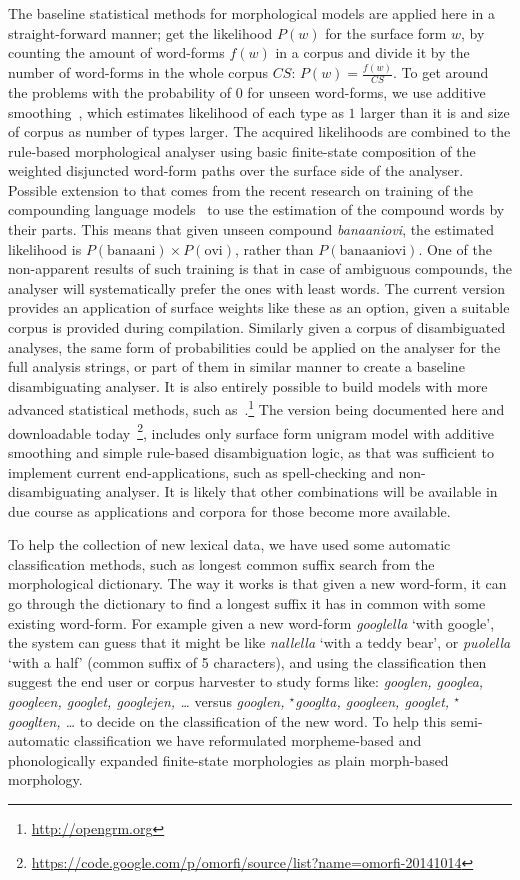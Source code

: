 \documentclass[a4paper,12pt]{article}
\begin{document}
The baseline statistical methods for morphological models are applied here in a
straight-forward manner; get the likelihood $P(w)$ for the surface form $w$, by
counting the amount of word-forms $f(w)$ in a corpus and divide it by the
number of word-forms in the whole corpus $CS$: $P(w) = \frac{f(w)}{CS}$.  To
get around the problems with the probability of $0$ for unseen word-forms, we
use additive smoothing~\citep{chen1999empirical}, which estimates likelihood of
each type as $1$ larger than it is and size of corpus as number of types
larger. The acquired likelihoods are combined to the rule-based morphological
analyser using basic finite-state composition of the weighted disjuncted
word-form paths over the surface side of the analyser. Possible extension to
that comes from the recent research on training of the compounding language
models~\citep{pirinen2009weighting} to use the estimation of the compound words
by their parts. This means that given unseen compound \emph{banaaniovi}, the
estimated likelihood is $P(\mathrm{banaani}) \times P(\mathrm{ovi})$, rather
than $P(\mathrm{banaaniovi})$. One of the non-apparent results of such training
is that in case of ambiguous compounds, the analyser will systematically prefer
the ones with least words. The current version provides an application of
surface weights like these as an option, given a suitable corpus is provided
during compilation. Similarly given a corpus of disambiguated analyses, the
same form of probabilities could be applied on the analyser for the full
analysis strings, or part of them in similar manner to create a baseline
disambiguating analyser. It is also entirely possible to build models with more
advanced statistical methods, such
as~\citet{opengrm}.\footnote{\url{http://opengrm.org}} The version being
documented here and downloadable
today~\footnote{\url{https://code.google.com/p/omorfi/source/list?name=omorfi-20141014}},
includes only surface form unigram model with additive smoothing and simple
rule-based disambiguation logic, as that was sufficient to implement current
end-applications, such as spell-checking and non-disambiguating analyser. It is
likely that other combinations will be available in due course as applications
and corpora for those become more available.


To help the collection of new lexical data, we have used some automatic
classification methods, such as longest common suffix search from the
morphological dictionary.  The way it works is that given a new word-form, it
can go through the dictionary to find a longest suffix it has in common with
some existing word-form. For example  given a new word-form \emph{googlella}
`with google', the system can guess that it might be like \emph{nallella} `with
a teddy bear', or \emph{puolella} `with a half' (common suffix of 5
characters), and using the classification then suggest the end user or corpus
harvester to study forms like: \emph{googlen, googlea, googleen, googlet,
googlejen, \ldots} versus \emph{googlen, ${}^\star$googlta, googleen, googlet,
${}^\star$googlten, \ldots} to decide on the classification of the new word. To
help this semi-automatic classification we have reformulated morpheme-based and
phonologically expanded finite-state morphologies as plain morph-based
morphology.
\end{document}
